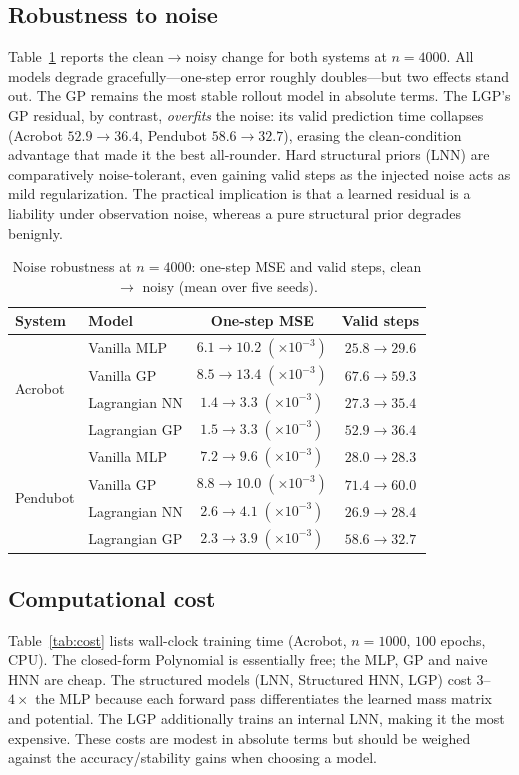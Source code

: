 \documentclass[conference]{IEEEtran}
\begin{document}
\subsection{Robustness to noise}
Table~\ref{tab:noise} reports the clean$\to$noisy change for both systems at
$n{=}4000$. All models degrade gracefully---one-step error roughly doubles---but
two effects stand out. The GP remains the most stable rollout model in absolute
terms. The LGP's GP residual, by contrast, \emph{overfits} the noise: its valid
prediction time collapses (Acrobot $52.9\!\to\!36.4$, Pendubot $58.6\!\to\!32.7$),
erasing the clean-condition advantage that made it the best all-rounder. Hard
structural priors (LNN) are comparatively noise-tolerant, even gaining valid steps
as the injected noise acts as mild regularization. The practical implication is
that a learned residual is a liability under observation noise, whereas a pure
structural prior degrades benignly.

\begin{table}[t]
\caption{Noise robustness at $n{=}4000$: one-step MSE and valid steps,
clean $\to$ noisy (mean over five seeds).}
\label{tab:noise}
\centering
\begin{tabular}{llcc}
\toprule
System & Model & One-step MSE & Valid steps \\
\midrule
\multirow{4}{*}{Acrobot}
 & Vanilla MLP   & $6.1\!\to\!10.2\;(\times10^{-3})$ & $25.8 \to 29.6$ \\
 & Vanilla GP    & $8.5\!\to\!13.4\;(\times10^{-3})$ & $67.6 \to 59.3$ \\
 & Lagrangian NN & $1.4\!\to\!3.3\;(\times10^{-3})$ & $27.3 \to 35.4$ \\
 & Lagrangian GP & $1.5\!\to\!3.3\;(\times10^{-3})$ & $52.9 \to 36.4$ \\
\midrule
\multirow{4}{*}{Pendubot}
 & Vanilla MLP   & $7.2\!\to\!9.6\;(\times10^{-3})$ & $28.0 \to 28.3$ \\
 & Vanilla GP    & $8.8\!\to\!10.0\;(\times10^{-3})$ & $71.4 \to 60.0$ \\
 & Lagrangian NN & $2.6\!\to\!4.1\;(\times10^{-3})$ & $26.9 \to 28.4$ \\
 & Lagrangian GP & $2.3\!\to\!3.9\;(\times10^{-3})$ & $58.6 \to 32.7$ \\
\bottomrule
\end{tabular}
\end{table}

\subsection{Computational cost}
Table~\ref{tab:cost} lists wall-clock training time (Acrobot, $n{=}1000$, $100$
epochs, CPU). The closed-form Polynomial is essentially free; the MLP, GP and naive
HNN are cheap. The structured models (LNN, Structured HNN, LGP) cost $3$--$4\times$
the MLP because each forward pass differentiates the learned mass matrix and
potential. The LGP additionally trains an internal LNN, making it the most
expensive. These costs are modest in absolute terms but should be weighed against
the accuracy/stability gains when choosing a model.
\end{document}
